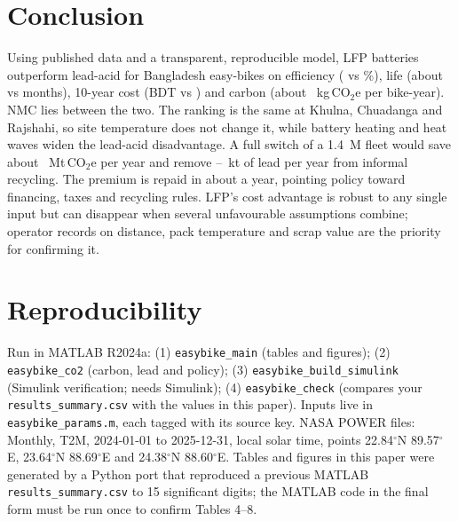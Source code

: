 \section{Conclusion}
Using published data and a transparent, reproducible model, LFP batteries outperform lead-acid for Bangladesh easy-bikes on efficiency (\effLFP{} vs \effLA\%), life (about \lifeLFP{} vs \lifeLA{} months), 10-year cost (BDT \tcoLFP{} vs \tcoLA) and carbon (about \saveLFPbike{}~kg\,CO$_2$e per bike-year). NMC lies between the two. The ranking is the same at Khulna, Chuadanga and Rajshahi, so site temperature does not change it, while battery heating and heat waves widen the lead-acid disadvantage. A full switch of a 1.4~M fleet would save about \fleetLFPa{}~Mt\,CO$_2$e per year and remove \leadLow--\leadHigh{}~kt of lead per year from informal recycling. The premium is repaid in about a year, pointing policy toward financing, taxes and recycling rules. LFP's cost advantage is robust to any single input but can disappear when several unfavourable assumptions combine; operator records on distance, pack temperature and scrap value are the priority for confirming it.
\section{Reproducibility}
Run in MATLAB R2024a: (1) \texttt{easybike\_main} (tables and figures); (2) \texttt{easybike\_co2} (carbon, lead and policy); (3) \texttt{easybike\_build\_simulink} (Simulink verification; needs Simulink); (4) \texttt{easybike\_check} (compares your \texttt{results\_summary.csv} with the values in this paper). Inputs live in \texttt{easybike\_params.m}, each tagged with its source key. NASA POWER files: Monthly, T2M, 2024-01-01 to 2025-12-31, local solar time, points 22.84$^\circ$N 89.57$^\circ$E, 23.64$^\circ$N 88.69$^\circ$E and 24.38$^\circ$N 88.60$^\circ$E. Tables and figures in this paper were generated by a Python port that reproduced a previous MATLAB \texttt{results\_summary.csv} to 15 significant digits; the MATLAB code in the final form must be run once to confirm Tables 4--8.
